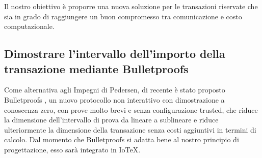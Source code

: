 Il nostro obiettivo è proporre una nuova soluzione per le transazioni riservate che sia in grado di raggiungere un buon compromesso tra comunicazione e costo computazionale.

\subsection{Dimostrare l'intervallo dell'importo della transazione mediante Bulletproofs}
Come alternativa agli Impegni di Pedersen, di recente è stato proposto Bulletproofs \cite{c5}, un nuovo protocollo non interattivo con dimostrazione a conoscenza zero, con prove molto brevi e senza configurazione trusted, che riduce la dimensione dell'intervallo di prova da lineare a sublineare e riduce ulteriormente la dimensione della transazione senza costi aggiuntivi in termini di calcolo. Dal momento che  Bulletproofs si adatta bene al nostro principio di progettazione, esso sarà integrato in IoTeX.